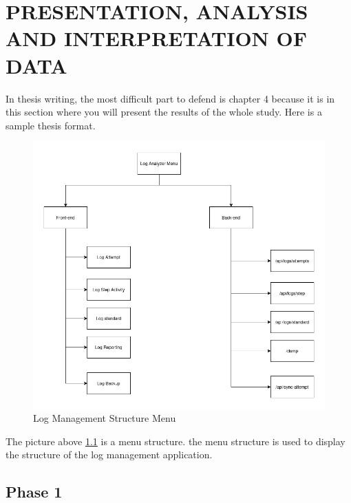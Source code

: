 \chapter{PRESENTATION, ANALYSIS AND INTERPRETATION OF DATA}
In thesis writing, the most difficult part to defend is chapter 4 because it is in this section where you will present the results of the whole study. Here is a sample thesis format.
\begin{figure}[H] 
	\centering
	\includegraphics[width=14cm]{figure/structure menu.png}
	\caption{Log Management Structure Menu}
	\label{fig:structure-menu}
\end{figure}

The picture above \ref{fig:structure-menu} is a menu structure. the menu structure is used to display the structure of the log management application.
\section{Phase 1}

